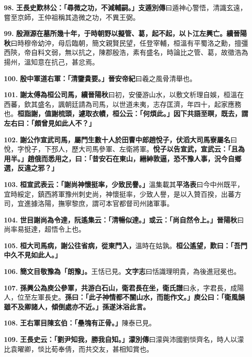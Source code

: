 \textbf{98.} \textbf{王長史歎林公：「尋微之功，不減輔嗣。」}{\footnotesize \textbf{支遁別傳}曰遁神心警悟，清識玄遠，嘗至京師，王仲祖稱其造微之功，不異王弼。}

\textbf{99.} \textbf{殷淵源在墓所幾十年，于時朝野以擬管、葛，起不起，以卜江左興亡。}{\footnotesize \textbf{續晉陽秋}曰時穆帝幼沖，母后臨朝，簡文親賢民望，任登宰輔，桓溫有平蜀洛之勳，擅彊西陝，帝自料文弱，無以抗之，陳郡殷浩，素有盛名，時論比之管、葛，故徵浩為揚州，溫知意在抗己，甚忿焉。}

\textbf{100.} \textbf{殷中軍道右軍：「清鑒貴要。」}{\footnotesize \textbf{晉安帝紀}曰羲之風骨清舉也。}

\textbf{101.} \textbf{謝太傅為桓公司馬，}{\footnotesize \textbf{續晉陽秋}曰初，安優游山水，以敷文析理自娛，桓溫在西蕃，欽其盛名，諷朝廷請為司馬，以世道未夷，志存匡濟，年四十，起家應務也。}\textbf{桓詣謝，值謝梳頭，遽取衣幘，桓公云：「何煩此。」因下共語至暝，既去，謂左右曰：「頗曾見如此人不？」}

\textbf{102.} \textbf{謝公作宣武司馬，屬門生數十人於田曹中郎趙悅子，}{\footnotesize \textbf{伏滔大司馬寮屬名}曰悅，字悅子，下邳人，歷大司馬參軍、左衛將軍。}\textbf{悅子以告宣武，宣武云：「且為用半。」趙俄而悉用之，曰：「昔安石在東山，縉紳敦逼，恐不豫人事，況今自鄉選，反違之邪？」}

\textbf{103.} \textbf{桓宣武表云：「謝尚神懷挺率，少致民譽。」}{\footnotesize 溫集載其\textbf{平洛表}曰今中州既平，宜時綏定，鎮西將軍豫州刺史尚，神懷挺率，少致人譽，是以入贊百揆，出蕃方司，宜進據洛陽，撫寧黎庶，謂可本官都督司州諸軍事。}

\textbf{104.} \textbf{世目謝尚為令達，阮遙集云：「清暢似達。」或云：「尚自然令上。」}{\footnotesize \textbf{晉陽秋}曰尚率易挺達，超悟令上也。}

\textbf{105.} \textbf{桓大司馬病，謝公往省病，從東門入，}{\footnotesize 溫時在姑孰。}\textbf{桓公遙望，歎曰：「吾門中久不見如此人。」}

\textbf{106.} \textbf{簡文目敬豫為「朗豫」。}{\footnotesize 王恬已見。\textbf{文字志}曰恬識理明貴，為後進冠冕也。}

\textbf{107.} \textbf{孫興公為庾公參軍，共游白石山，衛君長在坐，}{\footnotesize \textbf{衛氏譜}曰永，字君長，成陽人，位至左軍長史。}\textbf{孫曰：「此子神情都不關山水，而能作文。」庾公曰：「衛風韻雖不及卿諸人，傾倒處亦不近。」孫遂沐浴此言。}

\textbf{108.} \textbf{王右軍目陳玄伯：「壘塊有正骨。」}{\footnotesize 陳泰已見。}

\textbf{109.} \textbf{王長史云：「劉尹知我，勝我自知。」}{\footnotesize \textbf{濛別傳}曰濛與沛國劉惔齊名，時人以濛比袁曜卿，惔比荀奉倩，而共交友，甚相知賞也。}

